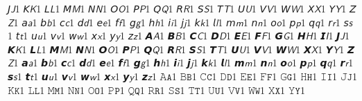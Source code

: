 {𝘑}{{\(\mathsfit{J}\)}}1 {𝘒}{{\(\mathsfit{K}\)}}1 {𝘓}{{\(\mathsfit{L}\)}}1 {𝘔}{{\(\mathsfit{M}\)}}1 {𝘕}{{\(\mathsfit{N}\)}}1 {𝘖}{{\(\mathsfit{O}\)}}1 {𝘗}{{\(\mathsfit{P}\)}}1 {𝘘}{{\(\mathsfit{Q}\)}}1 {𝘙}{{\(\mathsfit{R}\)}}1 {𝘚}{{\(\mathsfit{S}\)}}1 {𝘛}{{\(\mathsfit{T}\)}}1 {𝘜}{{\(\mathsfit{U}\)}}1 {𝘝}{{\(\mathsfit{V}\)}}1 {𝘞}{{\(\mathsfit{W}\)}}1 {𝘟}{{\(\mathsfit{X}\)}}1 {𝘠}{{\(\mathsfit{Y}\)}}1 {𝘡}{{\(\mathsfit{Z}\)}}1 {𝘢}{{\(\mathsfit{a}\)}}1 {𝘣}{{\(\mathsfit{b}\)}}1 {𝘤}{{\(\mathsfit{c}\)}}1 {𝘥}{{\(\mathsfit{d}\)}}1 {𝘦}{{\(\mathsfit{e}\)}}1 {𝘧}{{\(\mathsfit{f}\)}}1 {𝘨}{{\(\mathsfit{g}\)}}1 {𝘩}{{\(\mathsfit{h}\)}}1 {𝘪}{{\(\mathsfit{i}\)}}1 {𝘫}{{\(\mathsfit{j}\)}}1 {𝘬}{{\(\mathsfit{k}\)}}1 {𝘭}{{\(\mathsfit{l}\)}}1 {𝘮}{{\(\mathsfit{m}\)}}1 {𝘯}{{\(\mathsfit{n}\)}}1 {𝘰}{{\(\mathsfit{o}\)}}1 {𝘱}{{\(\mathsfit{p}\)}}1 {𝘲}{{\(\mathsfit{q}\)}}1 {𝘳}{{\(\mathsfit{r}\)}}1 {𝘴}{{\(\mathsfit{s}\)}}1 {𝘵}{{\(\mathsfit{t}\)}}1 {𝘶}{{\(\mathsfit{u}\)}}1 {𝘷}{{\(\mathsfit{v}\)}}1 {𝘸}{{\(\mathsfit{w}\)}}1 {𝘹}{{\(\mathsfit{x}\)}}1 {𝘺}{{\(\mathsfit{y}\)}}1 {𝘻}{{\(\mathsfit{z}\)}}1 {𝘼}{{\(\bm{{\mathsfit{A}}}\)}}1 {𝘽}{{\(\bm{{\mathsfit{B}}}\)}}1 {𝘾}{{\(\bm{{\mathsfit{C}}}\)}}1 {𝘿}{{\(\bm{{\mathsfit{D}}}\)}}1 {𝙀}{{\(\bm{{\mathsfit{E}}}\)}}1 {𝙁}{{\(\bm{{\mathsfit{F}}}\)}}1 {𝙂}{{\(\bm{{\mathsfit{G}}}\)}}1 {𝙃}{{\(\bm{{\mathsfit{H}}}\)}}1 {𝙄}{{\(\bm{{\mathsfit{I}}}\)}}1 {𝙅}{{\(\bm{{\mathsfit{J}}}\)}}1 {𝙆}{{\(\bm{{\mathsfit{K}}}\)}}1 {𝙇}{{\(\bm{{\mathsfit{L}}}\)}}1 {𝙈}{{\(\bm{{\mathsfit{M}}}\)}}1 {𝙉}{{\(\bm{{\mathsfit{N}}}\)}}1 {𝙊}{{\(\bm{{\mathsfit{O}}}\)}}1 {𝙋}{{\(\bm{{\mathsfit{P}}}\)}}1 {𝙌}{{\(\bm{{\mathsfit{Q}}}\)}}1 {𝙍}{{\(\bm{{\mathsfit{R}}}\)}}1 {𝙎}{{\(\bm{{\mathsfit{S}}}\)}}1 {𝙏}{{\(\bm{{\mathsfit{T}}}\)}}1 {𝙐}{{\(\bm{{\mathsfit{U}}}\)}}1 {𝙑}{{\(\bm{{\mathsfit{V}}}\)}}1 {𝙒}{{\(\bm{{\mathsfit{W}}}\)}}1 {𝙓}{{\(\bm{{\mathsfit{X}}}\)}}1 {𝙔}{{\(\bm{{\mathsfit{Y}}}\)}}1 {𝙕}{{\(\bm{{\mathsfit{Z}}}\)}}1 {𝙖}{{\(\bm{{\mathsfit{a}}}\)}}1 {𝙗}{{\(\bm{{\mathsfit{b}}}\)}}1 {𝙘}{{\(\bm{{\mathsfit{c}}}\)}}1 {𝙙}{{\(\bm{{\mathsfit{d}}}\)}}1 {𝙚}{{\(\bm{{\mathsfit{e}}}\)}}1 {𝙛}{{\(\bm{{\mathsfit{f}}}\)}}1 {𝙜}{{\(\bm{{\mathsfit{g}}}\)}}1 {𝙝}{{\(\bm{{\mathsfit{h}}}\)}}1 {𝙞}{{\(\bm{{\mathsfit{i}}}\)}}1 {𝙟}{{\(\bm{{\mathsfit{j}}}\)}}1 {𝙠}{{\(\bm{{\mathsfit{k}}}\)}}1 {𝙡}{{\(\bm{{\mathsfit{l}}}\)}}1 {𝙢}{{\(\bm{{\mathsfit{m}}}\)}}1 {𝙣}{{\(\bm{{\mathsfit{n}}}\)}}1 {𝙤}{{\(\bm{{\mathsfit{o}}}\)}}1 {𝙥}{{\(\bm{{\mathsfit{p}}}\)}}1 {𝙦}{{\(\bm{{\mathsfit{q}}}\)}}1 {𝙧}{{\(\bm{{\mathsfit{r}}}\)}}1 {𝙨}{{\(\bm{{\mathsfit{s}}}\)}}1 {𝙩}{{\(\bm{{\mathsfit{t}}}\)}}1 {𝙪}{{\(\bm{{\mathsfit{u}}}\)}}1 {𝙫}{{\(\bm{{\mathsfit{v}}}\)}}1 {𝙬}{{\(\bm{{\mathsfit{w}}}\)}}1 {𝙭}{{\(\bm{{\mathsfit{x}}}\)}}1 {𝙮}{{\(\bm{{\mathsfit{y}}}\)}}1 {𝙯}{{\(\bm{{\mathsfit{z}}}\)}}1 {𝙰}{{\(\mathtt{A}\)}}1 {𝙱}{{\(\mathtt{B}\)}}1 {𝙲}{{\(\mathtt{C}\)}}1 {𝙳}{{\(\mathtt{D}\)}}1 {𝙴}{{\(\mathtt{E}\)}}1 {𝙵}{{\(\mathtt{F}\)}}1 {𝙶}{{\(\mathtt{G}\)}}1 {𝙷}{{\(\mathtt{H}\)}}1 {𝙸}{{\(\mathtt{I}\)}}1 {𝙹}{{\(\mathtt{J}\)}}1 {𝙺}{{\(\mathtt{K}\)}}1 {𝙻}{{\(\mathtt{L}\)}}1 {𝙼}{{\(\mathtt{M}\)}}1 {𝙽}{{\(\mathtt{N}\)}}1 {𝙾}{{\(\mathtt{O}\)}}1 {𝙿}{{\(\mathtt{P}\)}}1 {𝚀}{{\(\mathtt{Q}\)}}1 {𝚁}{{\(\mathtt{R}\)}}1 {𝚂}{{\(\mathtt{S}\)}}1 {𝚃}{{\(\mathtt{T}\)}}1 {𝚄}{{\(\mathtt{U}\)}}1 {𝚅}{{\(\mathtt{V}\)}}1 {𝚆}{{\(\mathtt{W}\)}}1 {𝚇}{{\(\mathtt{X}\)}}1 {𝚈}{{\(\mathtt{Y}\)}}1 